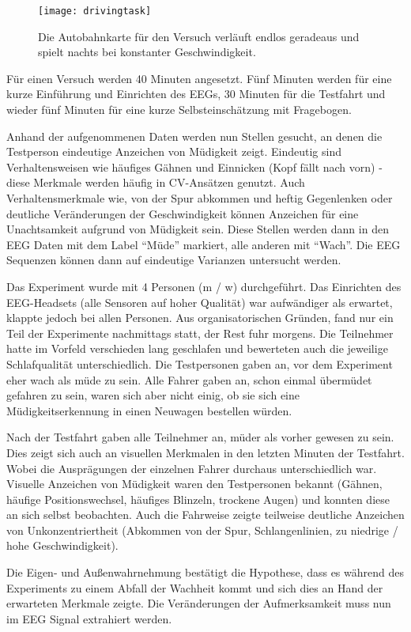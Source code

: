 \begin{figure}[h] 
  \begin{center}
    \texttt{[image: drivingtask]}
    \caption[Driving Task Screenshot]{Die Autobahnkarte für den Versuch verläuft endlos geradeaus und spielt nachts bei konstanter Geschwindigkeit. \label{fig:drivingtask}}
  \end{center}
\end{figure}

Für einen Versuch werden 40 Minuten angesetzt. Fünf Minuten werden für eine kurze Einführung und Einrichten des EEGs, 30 Minuten für die Testfahrt und wieder fünf Minuten für eine kurze Selbsteinschätzung mit Fragebogen.

Anhand der aufgenommenen Daten werden nun Stellen gesucht, an denen die Testperson eindeutige Anzeichen von Müdigkeit zeigt. Eindeutig sind Verhaltensweisen wie häufiges Gähnen und Einnicken (Kopf fällt nach vorn) - diese Merkmale werden häufig in CV-Ansätzen genutzt. 
Auch Verhaltensmerkmale wie, von der Spur abkommen und heftig Gegenlenken oder deutliche Veränderungen der Geschwindigkeit können Anzeichen für eine Unachtsamkeit aufgrund von Müdigkeit sein. Diese Stellen werden dann in den EEG Daten mit dem Label "`Müde"' markiert, alle anderen mit "`Wach"'. Die EEG Sequenzen können dann auf eindeutige Varianzen untersucht werden. 

Das Experiment wurde mit 4 Personen (m / w) durchgeführt. Das Einrichten des EEG-Headsets (alle Sensoren auf hoher Qualität) war aufwändiger als erwartet, klappte jedoch bei allen Personen. Aus organisatorischen Gründen, fand nur ein Teil der Experimente nachmittags statt, der Rest fuhr morgens. Die Teilnehmer hatte im Vorfeld verschieden lang geschlafen und bewerteten auch die jeweilige Schlafqualität unterschiedlich. Die Testpersonen gaben an, vor dem Experiment eher wach als müde zu sein. Alle Fahrer gaben an, schon einmal übermüdet gefahren zu sein, waren sich aber nicht einig, ob sie sich eine Müdigkeitserkennung in einen Neuwagen bestellen würden.

Nach der Testfahrt gaben alle Teilnehmer an, müder als vorher gewesen zu sein. Dies zeigt sich auch an visuellen Merkmalen in den letzten Minuten der Testfahrt. Wobei die Ausprägungen der einzelnen Fahrer durchaus unterschiedlich war. Visuelle Anzeichen von Müdigkeit waren den Testpersonen bekannt (Gähnen, häufige Positionswechsel, häufiges Blinzeln, trockene Augen) und konnten diese an sich selbst beobachten. Auch die Fahrweise zeigte teilweise deutliche Anzeichen von Unkonzentriertheit (Abkommen von der Spur, Schlangenlinien, zu niedrige / hohe Geschwindigkeit).

Die Eigen- und Außenwahrnehmung bestätigt die Hypothese, dass es während des Experiments zu einem Abfall der Wachheit kommt und sich dies an Hand der erwarteten Merkmale zeigte. Die Veränderungen der Aufmerksamkeit muss nun im EEG Signal extrahiert werden.